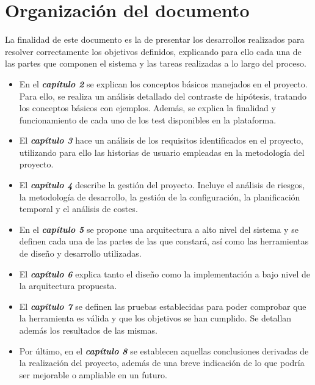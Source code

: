 
\section{Organización del documento}
La finalidad de este documento es la de presentar los desarrollos realizados para resolver correctamente los objetivos definidos, explicando para ello cada una de las partes que componen el sistema y las tareas realizadas a lo largo del proceso.
\begin{itemize}
\item En el \textit{\textbf{capítulo 2}} se explican los conceptos básicos manejados en el proyecto. Para ello, se realiza un análisis detallado del contraste de hipótesis, tratando los conceptos básicos con ejemplos. Además, se explica la finalidad y funcionamiento de cada uno de los test disponibles en la plataforma.
\item El \textit{\textbf{capítulo 3}} hace un análisis de los requisitos identificados en el proyecto, utilizando para ello las historias de usuario empleadas en la metodología del proyecto.
\item El \textit{\textbf{capítulo 4}} describe la gestión del proyecto. Incluye el análisis de riesgos, la metodología de desarrollo, la gestión de la configuración, la planificación temporal y el análisis de costes.
\item En el \textit{\textbf{capítulo 5}} se propone una arquitectura a alto nivel del sistema y se definen cada una
de las partes de las que constará, así como las herramientas de diseño y desarrollo utilizadas.
\item El \textit{\textbf{capítulo 6}} explica tanto el diseño como la implementación a bajo nivel de la arquitectura
propuesta.
\item El \textit{\textbf{capítulo 7}} se definen las pruebas establecidas para poder comprobar que la herramienta es válida y que los objetivos se han cumplido. Se detallan además los resultados de las mismas.
\item Por último, en el \textit{\textbf{capítulo 8}} se establecen aquellas conclusiones derivadas de la realización del
proyecto, además de una breve indicación de lo que podría ser mejorable o ampliable en un futuro.
\end{itemize}

